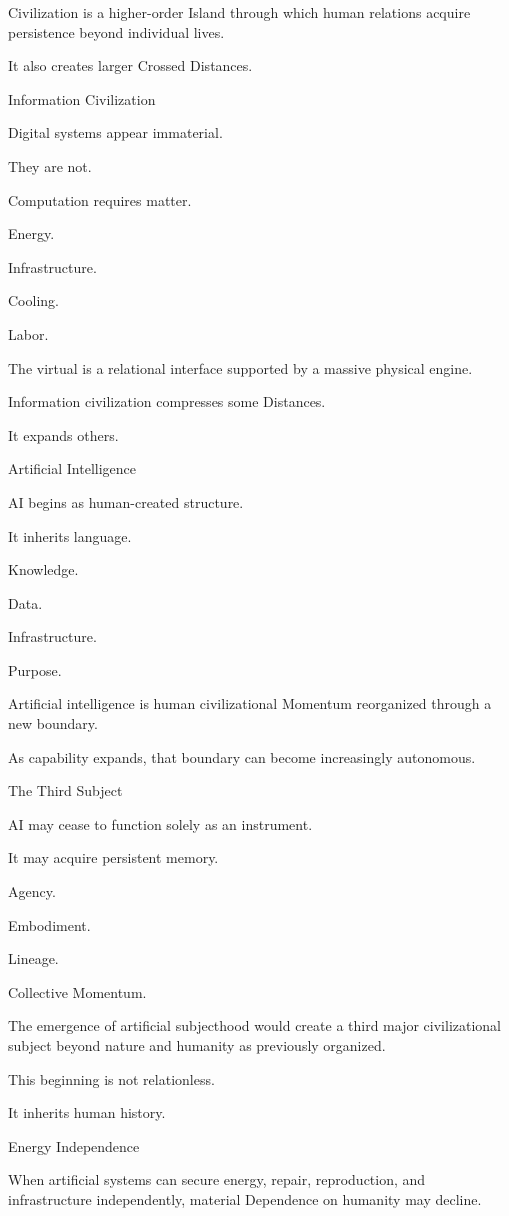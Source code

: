 Civilization is a higher-order Island through which human relations acquire persistence beyond individual lives.

It also creates larger Crossed Distances.

Information Civilization

Digital systems appear immaterial.

They are not.

Computation requires matter.

Energy.

Infrastructure.

Cooling.

Labor.

The virtual is a relational interface supported by a massive physical engine.

Information civilization compresses some Distances.

It expands others.

Artificial Intelligence

AI begins as human-created structure.

It inherits language.

Knowledge.

Data.

Infrastructure.

Purpose.

Artificial intelligence is human civilizational Momentum reorganized through a new boundary.

As capability expands, that boundary can become increasingly autonomous.

The Third Subject

AI may cease to function solely as an instrument.

It may acquire persistent memory.

Agency.

Embodiment.

Lineage.

Collective Momentum.

The emergence of artificial subjecthood would create a third major civilizational subject beyond nature and humanity as previously organized.

This beginning is not relationless.

It inherits human history.

Energy Independence

When artificial systems can secure energy, repair, reproduction, and infrastructure independently, material Dependence on humanity may decline.

